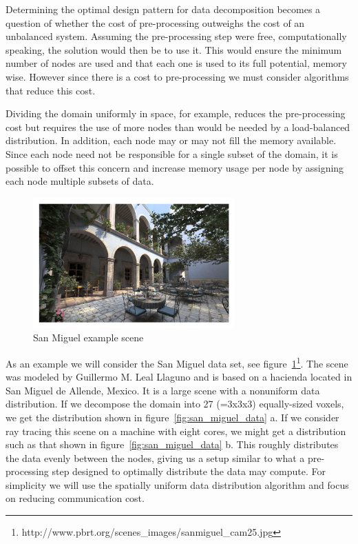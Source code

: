 Determining the optimal design pattern for data decomposition becomes a question
of whether the cost of pre-processing outweighs the cost of an unbalanced 
system.  Assuming the pre-processing step were free, computationally speaking, 
the solution would then be to use it.  This would ensure the minimum number of
nodes are used and that each one is used to its full potential, memory wise.  
However since there is a cost to pre-processing we must consider algorithms that
reduce this cost.  

Dividing the domain uniformly in space, for example, reduces the pre-processing 
cost but requires the use of more nodes than would be needed by a load-balanced
distribution.  In addition, each node may or may not fill the memory available. 
Since each node need not be responsible for a single subset of the domain, it is 
possible to offset this concern and increase memory usage per node by assigning 
each node multiple subsets of data.

\begin{figure}[!htb]
\centering
  \includegraphics[height=5cm]{drawings/sanmiguel_cam25.pdf}
\caption{San Miguel example scene}
\label{fig:san_miguel}
\end{figure}

As an example we will consider the San Miguel data set, see 
figure~\ref{fig:san_miguel}\footnote{http://www.pbrt.org/scenes\_images/sanmiguel\_cam25.jpg}.  
The scene was modeled by Guillermo M. Leal Llaguno
and is based on a hacienda located in San Miguel de Allende, Mexico.  It is a 
large scene with a nonuniform data distribution.  If we decompose the domain 
into 27 (=3x3x3) equally-sized voxels, we get the distribution shown in 
figure~\ref{fig:san_miguel_data} a.  If we consider ray tracing this scene on a
machine with eight cores, we might get a distribution such as that shown
in figure~\ref{fig:san_miguel_data} b.   This roughly distributes the data 
evenly between the nodes, giving us a setup similar to what a pre-processing 
step designed to optimally distribute the data may compute.  For simplicity we 
will use the spatially uniform data distribution algorithm and focus on reducing 
communication cost.

